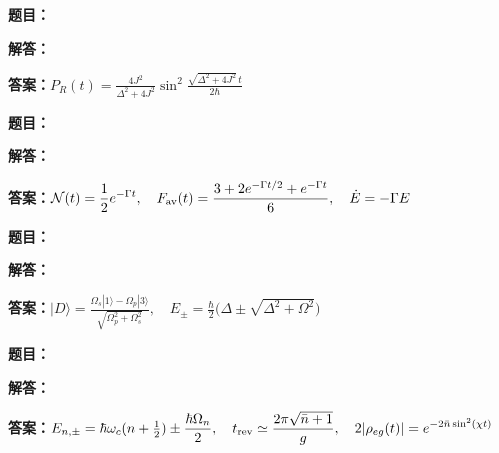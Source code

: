 \documentclass[lang=cn,color=blue,11pt]{elegantbook}
\begin{document}
\noindent\textbf{题目：}
\par\noindent\textbf{解答：}
\par\noindent\textbf{答案：}\(\displaystyle P_R(t)=\frac{4J^2}{\Delta^2+4J^2}\sin^2\frac{\sqrt{\Delta^2+4J^2}\,t}{2\hbar}\)\par
\par\smallskip\noindent\hrulefill\par\medskip
{}\par
\noindent\textbf{题目：}
\par\noindent\textbf{解答：}
\par\noindent\textbf{答案：}\(\displaystyle \mathcal N(t)=\frac12e^{-\Gamma t},\quad F_{\rm av}(t)=\frac{3+2e^{-\Gamma t/2}+e^{-\Gamma t}}6,\quad \dot E=-\Gamma E\)\par
\par\smallskip\noindent\hrulefill\par\medskip
{}\par
\noindent\textbf{题目：}
\par\noindent\textbf{解答：}
\par\noindent\textbf{答案：}\(\displaystyle |D\rangle=\frac{\Omega_s|1\rangle-\Omega_p|3\rangle}{\sqrt{\Omega_p^2+\Omega_s^2}},\quad E_\pm=\frac{\hbar}{2}\bigl(\Delta\pm\sqrt{\Delta^2+\Omega^2}\bigr)\)\par
\par\smallskip\noindent\hrulefill\par\medskip
{}\par
\noindent\textbf{题目：}
\par\noindent\textbf{解答：}
\par\noindent\textbf{答案：}\(\displaystyle E_{n,\pm}=\hbar\omega_c(n+\tfrac12)\pm\frac{\hbar\Omega_n}{2},\quad t_{\rm rev}\simeq\frac{2\pi\sqrt{\bar n+1}}g,\quad 2|\rho_{eg}(t)|=e^{-2\bar n\sin^2(\chi t)}\)\par
\par\smallskip\noindent\hrulefill\par\medskip
\end{document}
